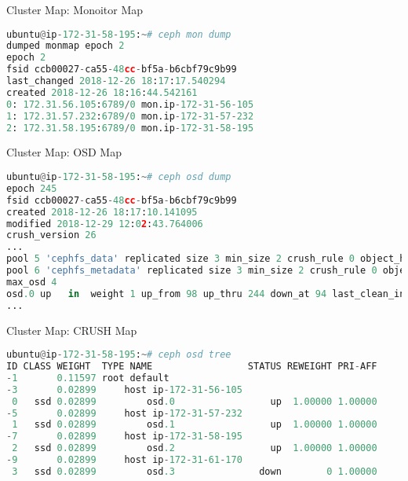 \begin{frame}[fragile]{Cluster Map: Monoitor Map}
\begin{lstlisting}[language=python]
ubuntu@ip-172-31-58-195:~# ceph mon dump
dumped monmap epoch 2
epoch 2
fsid ccb00027-ca55-48cc-bf5a-b6cbf79c9b99
last_changed 2018-12-26 18:17:17.540294
created 2018-12-26 18:16:44.542161
0: 172.31.56.105:6789/0 mon.ip-172-31-56-105
1: 172.31.57.232:6789/0 mon.ip-172-31-57-232
2: 172.31.58.195:6789/0 mon.ip-172-31-58-195 
\end{lstlisting}
\end{frame}

\begin{frame}[fragile]{Cluster Map: OSD Map}
\begin{lstlisting}[language=python]
ubuntu@ip-172-31-58-195:~# ceph osd dump
epoch 245
fsid ccb00027-ca55-48cc-bf5a-b6cbf79c9b99
created 2018-12-26 18:17:10.141095
modified 2018-12-29 12:02:43.764006
crush_version 26
...
pool 5 'cephfs_data' replicated size 3 min_size 2 crush_rule 0 object_hash rjenkins pg_num 64 pgp_num 64 last_change 48 flags hashpspool stripe_width 0 application cephfs
pool 6 'cephfs_metadata' replicated size 3 min_size 2 crush_rule 0 object_hash rjenkins pg_num 64 pgp_num 64 last_change 48 flags hashpspool stripe_width 0 application cephfs
max_osd 4
osd.0 up   in  weight 1 up_from 98 up_thru 244 down_at 94 last_clean_interval [90,93) 172.31.56.105:6801/2052 172.31.56.105:6802/2052 172.31.56.105:6803/2052 172.31.56.105:6804/2052 exists,up 2ee23b61-eca4-41e5-a6b0-277bfd6c48a1
...
\end{lstlisting}
\end{frame}

\begin{frame}[fragile]{Cluster Map: CRUSH Map}
\begin{lstlisting}[language=python]
ubuntu@ip-172-31-58-195:~# ceph osd tree
ID CLASS WEIGHT  TYPE NAME                 STATUS REWEIGHT PRI-AFF
-1       0.11597 root default
-3       0.02899     host ip-172-31-56-105
 0   ssd 0.02899         osd.0                 up  1.00000 1.00000
-5       0.02899     host ip-172-31-57-232
 1   ssd 0.02899         osd.1                 up  1.00000 1.00000
-7       0.02899     host ip-172-31-58-195
 2   ssd 0.02899         osd.2                 up  1.00000 1.00000
-9       0.02899     host ip-172-31-61-170
 3   ssd 0.02899         osd.3               down        0 1.00000
\end{lstlisting}
\end{frame}

